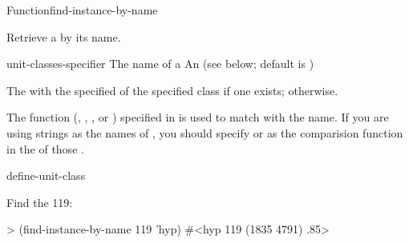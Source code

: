 \documentclass[10pt,twoside,english,pdftex]{article}
\begin{document}

\begin{functiondoc}{Function}{find-instance-by-name}{
      \returns{}
    } 
%
%
%

\fnsyntax

\fnpurpose Retrieve a  by its name.

\fnpackage {}

\fnmodule {}

\fnargs
\begin{args}{unit-classes-specifier}
\arg[name] The name of a 
 An 
(see below; default is )
\end{args}

\fnreturns The  with the specified  of
the specified class if one exists; \nil{} otherwise.

\fndsyntax
\unitclassspec
\subclassingspec

\fndescription The  function
(, , , or ) specified in
\textbf{} is used to match 
with the  name.  If you are using strings as the
names of , you should specify  or
 as the comparision function in the 
of those .

\begin{alsos}{define-unit-class}
\end{alsos}

\fnexample
Find the   119:
\begin{example}
> (find-instance-by-name 119 'hyp)
#<hyp 119 (1835 4791) .85>
\end{example}

\end{functiondoc}

\end{document}
